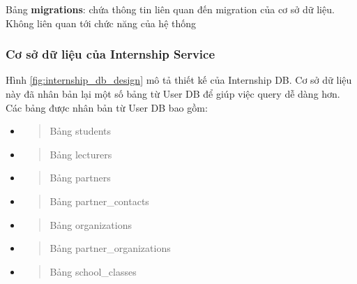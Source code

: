 \documentclass[./../main.tex]{subfiles}
\begin{document}
Bảng \textbf{migrations}: chứa thông tin liên quan đến migration của cơ sở dữ liệu. Không liên quan tới chức năng của hệ thống

\subsubsection{Cơ sở dữ liệu của Internship Service}

Hình \ref{fig:internship_db_design} mô tả thiết kế của Internship DB. Cơ sở dữ liệu này đã nhân bản lại một số bảng từ User DB để giúp việc query dễ dàng hơn. Các bảng được nhân bản từ User DB bao gồm:

\begin{itemize}
\item
  \begin{quote}
  Bảng students
  \end{quote}
\item
  \begin{quote}
  Bảng lecturers
  \end{quote}
\item
  \begin{quote}
  Bảng partners
  \end{quote}
\item
  \begin{quote}
  Bảng partner\_contacts
  \end{quote}
\item
  \begin{quote}
  Bảng organizations
  \end{quote}
\item
  \begin{quote}
  Bảng partner\_organizations
  \end{quote}
\item
  \begin{quote}
  Bảng school\_classes
  \end{quote}
\end{itemize}
\end{document}
